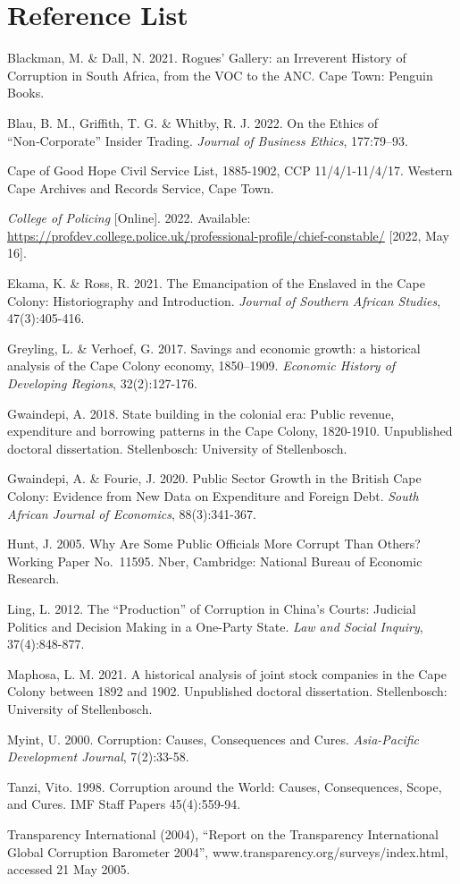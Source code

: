 \documentclass[12pt,preprint, authoryear]{elsarticle}
\numberwithin{equation}{section}
\numberwithin{figure}{section}
\numberwithin{table}{section}
\begin{document}
\newpage

\hypertarget{reference-list}{%
\section{Reference List}\label{reference-list}}

Blackman, M. \& Dall, N. 2021. Rogues' Gallery: an Irreverent History of
Corruption in South Africa, from the VOC to the ANC. Cape Town: Penguin
Books.

Blau, B. M., Griffith, T. G. \& Whitby, R. J. 2022. On the Ethics of
``Non‑Corporate'' Insider Trading. \emph{Journal of Business Ethics},
177:79--93.

Cape of Good Hope Civil Service List, 1885-1902, CCP 11/4/1-11/4/17.
Western Cape Archives and Records Service, Cape Town.

\emph{College of Policing} {[}Online{]}. 2022. Available:
\url{https://profdev.college.police.uk/professional-profile/chief-constable/}
{[}2022, May 16{]}.

Ekama, K. \& Ross, R. 2021. The Emancipation of the Enslaved in the Cape
Colony: Historiography and Introduction. \emph{Journal of Southern
African Studies}, 47(3):405-416.

Greyling, L. \& Verhoef, G. 2017. Savings and economic growth: a
historical analysis of the Cape Colony economy, 1850--1909.
\emph{Economic History of Developing Regions}, 32(2):127-176.

Gwaindepi, A. 2018. State building in the colonial era: Public revenue,
expenditure and borrowing patterns in the Cape Colony, 1820-1910.
Unpublished doctoral dissertation. Stellenbosch: University of
Stellenbosch.

Gwaindepi, A. \& Fourie, J. 2020. Public Sector Growth in the British
Cape Colony: Evidence from New Data on Expenditure and Foreign Debt.
\emph{South African Journal of Economics}, 88(3):341-367.

Hunt, J. 2005. Why Are Some Public Officials More Corrupt Than Others?
Working Paper No.~11595. Nber, Cambridge: National Bureau of Economic
Research.

Ling, L. 2012. The ``Production'' of Corruption in China's Courts:
Judicial Politics and Decision Making in a One-Party State. \emph{Law
and Social Inquiry}, 37(4):848-877.

Maphosa, L. M. 2021. A historical analysis of joint stock companies in
the Cape Colony between 1892 and 1902. Unpublished doctoral
dissertation. Stellenbosch: University of Stellenbosch.

Myint, U. 2000. Corruption: Causes, Consequences and Cures.
\emph{Asia-Pacific Development Journal}, 7(2):33-58.

Tanzi, Vito. 1998. Corruption around the World: Causes, Consequences,
Scope, and Cures. IMF Staff Papers 45(4):559-94.

Transparency International (2004), ``Report on the Transparency
International Global Corruption Barometer 2004'',
www.transparency.org/surveys/index.html, accessed 21 May 2005.


\end{document}
